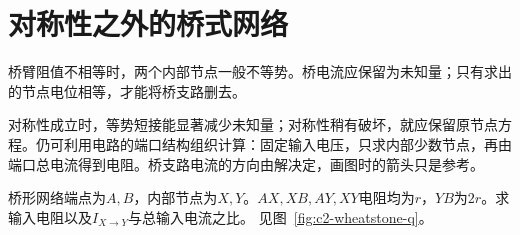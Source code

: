 \section{对称性之外的桥式网络}
桥臂阻值不相等时，两个内部节点一般不等势。桥电流应保留为未知量；只有求出的节点电位相等，才能将桥支路删去。

对称性成立时，等势短接能显著减少未知量；对称性稍有破坏，就应保留原节点方程。仍可利用电路的端口结构组织计算：固定输入电压，只求内部少数节点，再由端口总电流得到电阻。桥支路电流的方向由解决定，画图时的箭头只是参考。

\begin{example}[不平衡桥与桥电流方向]\label{ex:c2-wheatstone}
桥形网络端点为$A,B$，内部节点为$X,Y$。$AX,XB,AY,XY$电阻均为$r$，$YB$为$2r$。求输入电阻以及$I_{X\to Y}$与总输入电流之比。 见图~\ref{fig:c2-wheatstone-q}。
\end{example}


